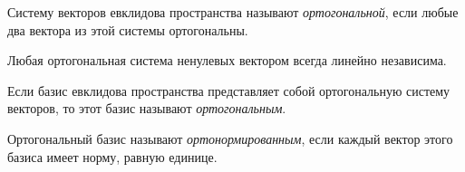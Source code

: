 \begin{definition}
  Систему векторов евклидова пространства называют \textit{ортогональной}, если любые два вектора из этой системы ортогональны.
\end{definition}

\begin{theorem}
  Любая ортогональная система ненулевых вектором всегда линейно независима.
\end{theorem}

\begin{definition}
  Если базис евклидова пространства представляет собой ортогональную систему векторов,
  то этот базис называют \textit{ортогональным}.
\end{definition}

\begin{definition}
  Ортогональный базис называют \textit{ортонормированным}, если каждый
вектор этого базиса имеет норму, равную единице.
\end{definition}

